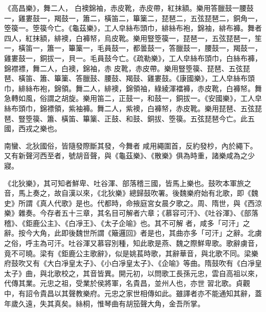 \begin{pinyinscope}
 《高昌樂》，舞二人，
 白襖錦袖，赤皮靴，赤皮帶，紅抹額。樂用答臘鼓一腰鼓一，雞婁鼓一，羯鼓一，簫二，橫笛二，篳篥二，琵琶二，五弦琵琶二，銅角一，箜篌一。箜篌今亡。《龜茲樂》，工人皁絲布頭巾，緋絲布袍，錦袖，緋布褲。舞者四人，紅抹額，緋襖，白褲帑，烏皮靴。樂用豎箜篌一，琵琶一，五弦琵琶一，笙一，橫笛一，簫一，篳篥一，毛員鼓一，都曇鼓一，答臘鼓一，腰鼓一，羯鼓一，雞婁鼓一，銅拔一，貝一。毛員鼓今亡。《疏勒樂》，工人皁絲布頭巾，白絲布褲，錦襟褾，舞二人，白襖，錦袖，赤
 皮靴，赤皮帶。樂用豎箜篌、琵琶、五弦琵琶、橫笛、簫、篳篥、答臘鼓、腰鼓、羯鼓、雞婁鼓。《康國樂》，工人皁絲布頭巾，緋絲布袍，錦領。舞二人，緋襖，錦領袖，綠綾渾襠褲，赤皮靴，白褲帑。舞急轉如風，俗謂之胡旋。樂用笛二，正鼓一，和鼓一，銅拔一。《安國樂》，工人皁絲布頭巾，錦褾領，紫袖褲。舞二人，紫襖，白褲帑，赤皮靴。樂用琵琶、五弦琵琶、豎箜篌、簫、橫笛、篳篥、正鼓、和鼓、銅拔、箜篌。五弦琵琶今亡。此五國，西戎之樂也。



 南蠻、北狄國俗，皆隨發際斷其發，今舞者
 咸用繩圍首，反約發杪，內於繩下。又有新聲河西至者，號胡音聲，與《龜茲樂》、《散樂》俱為時重，諸樂咸為之少寢。



 《北狄樂》，其可知者鮮卑、吐谷渾、部落稽三國，皆馬上樂也。鼓吹本軍旅之音，馬上奏之，故自漢以來，《北狄樂》總歸鼓吹署。後魏樂府始有北歌，即《魏史》所謂《真人代歌》是也。代都時，命掖庭宮女晨夕歌之。周、隋世，與《西涼樂》雜奏。今存者五十三章，其名目可解者六章；《慕容可汗》、《吐谷渾》、《部落稽》、《鉅鹿公主》、《白凈王》、《太子企喻》也。其不可解
 者，咸多「可汗」之辭。按今大角，此即後魏世所謂《簸邏回》者是也，其曲亦多「可汗」之辭。北虜之俗，呼主為可汗。吐谷渾又慕容別種，知此歌是燕、魏之際鮮卑歌。歌辭虜音，竟不可曉。梁有《鉅鹿公主歌辭》，似是姚萇時歌，其辭華音，與北歌不同。梁樂府鼓吹又有《大白凈皇太子》、《小白凈皇太子》、《企喻》等曲。隋鼓吹有《白凈皇太子》曲，與北歌校之，其音皆異。開元初，以問歌工長孫元忠，雲自高祖以來，代傳其業。元忠之祖，受業於侯將軍，名貴昌，並州人也，亦世
 習北歌。貞觀中，有詔令貴昌以其聲教樂府。元忠之家世相傳如此。雖譯者亦不能通知其辭，蓋年歲久遠，失其真矣。絲桐，惟琴曲有胡笳聲大角，金吾所掌。




\end{pinyinscope}
